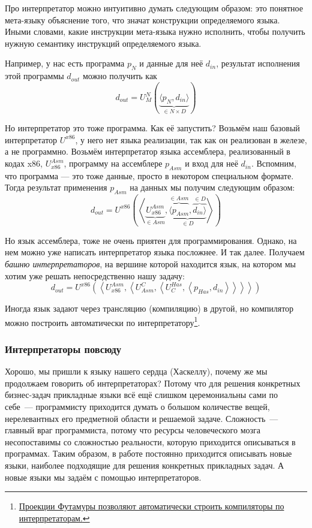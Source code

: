 \documentclass[12pt]{article}
\newcommand{\point}[1]{{\color{blue}\textit{#1}}} %
\begin{document}
    Про интерпретатор можно интуитивно думать следующим образом: это понятное мета-языку объяснение того, что значат конструкции определяемого языка.
    Иными словами, какие инструкции мета-языка нужно исполнить, чтобы получить нужную семантику инструкций определяемого языка.

    Например, у нас есть программа $p_N$ и данные для неё $d_{in}$, результат исполнения этой программы $d_{out}$ можно получить как \[d_{out} = U_M^N\left( \underbrace{\langle p_N, d_{in} \rangle}_{\in N\times D} \right)\]

    Но интерпретатор это тоже программа.
    Как её запустить?
    Возьмём наш базовый интерпретатор $U^{x86}$, у него нет языка реализации, так как он реализован в железе, а не программно.
    Возьмём интерпретатор языка ассемблера, реализованный в кодах x86, $U_{x86}^{Asm}$, программу на ассемблере $p_{Asm}$ и вход для неё $d_{in}$.
    Вспомним, что программа --- это тоже данные, просто в некотором специальном формате.
    Тогда результат применения $p_{Asm}$ на данных мы получим следующим образом:
    \[
        d_{out} = U^{x86}\left(\left<\underbrace{U_{x86}^{Asm}}_{\in Asm}, \underbrace{\overbrace{\langle p_{Asm}}^{\in Asm}, \overbrace{d_{in} \rangle}^{\in D}}_{\in D} \right>\right)
    \]

    Но язык ассемблера, тоже не очень приятен для программирования.
    Однако, на нем можно уже написать интерпретатор языка посложнее.
    И так далее.
    Получаем \point{башню интерпретаторов}, на вершине которой находится язык, на котором мы хотим уже решать непосредственно нашу задачу:
    \[
        d_{out} =
        U^{x86}\left(\left<
        U_{x86}^{Asm}, \left<
        U^C_{Asm}, \left<
        U^{Has}_C, \left< p_{Has}, d_{in}
        \right>\right>\right>\right>\right)
    \]

    Иногда язык задают через трансляцию (компиляцию) в другой, но компилятор можно построить автоматически по интерпретатору\footnote{\href{https://habr.com/ru/articles/47418/}{Проекции Футамуры позволяют автоматически строить компиляторы по интерпретаторам.}}.

    \subsubsection{Интерпретаторы повсюду}

    Хорошо, мы пришли к языку нашего сердца (Хаскеллу), почему же мы продолжаем говорить об интерпретаторах?
    Потому что для решения конкретных бизнес-задач прикладные языки всё ещё слишком церемониальны сами по себе~--- программисту приходится думать о большом количестве вещей, нерелевантных его предметной области и решаемой задаче.
    Сложность~--- главный враг программиста, потому что ресурсы человеческого мозга несопоставимы со сложностью реальности, которую приходится описываться в программах.
    Таким образом, в работе постоянно приходится описывать новые языки, наиболее подходящие для решения конкретных прикладных задач.
    А новые языки мы задаём с помощью интерпретаторов.
\end{document}

